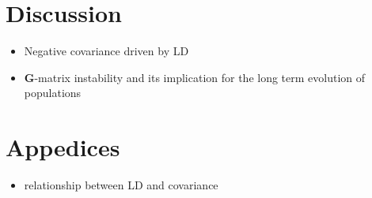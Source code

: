 \documentclass[11pt,one column]{article}
\begin{document}
\section*{Discussion}
\begin{itemize}
\item Negative covariance driven by LD
\item \textbf{G}-matrix instability and its implication for the long term evolution of populations
\end{itemize}




\section*{Appedices}
\begin{itemize}
\item relationship between LD and covariance
\end{itemize}
\end{document}
